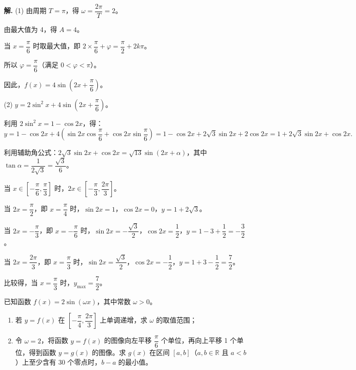\documentclass[11pt]{ctexrep}
\begin{document}
\textbf{解.} (1) 由周期 $T = \pi$，得 $\omega = \dfrac{2\pi}{T} = 2$。

由最大值为 4，得 $A = 4$。

当 $x = \dfrac{\pi}{6}$ 时取最大值，即 $2 \times \dfrac{\pi}{6} + \varphi = \dfrac{\pi}{2} + 2k\pi$。

所以 $\varphi = \dfrac{\pi}{6}$（满足 $0 < \varphi < \pi$）。

因此，$f(x) = 4\sin\left(2x + \dfrac{\pi}{6}\right)$。

(2) $y = 2\sin^2 x + 4\sin\left(2x + \dfrac{\pi}{6}\right)$。

利用 $2\sin^2 x = 1 - \cos 2x$，得：
\[
    y = 1 - \cos 2x + 4\left(\sin 2x\cos\frac{\pi}{6} + \cos 2x\sin\frac{\pi}{6}\right) = 1 - \cos 2x + 2\sqrt{3}\sin 2x + 2\cos 2x = 1 + 2\sqrt{3}\sin 2x + \cos 2x.
\]

利用辅助角公式：$2\sqrt{3}\sin 2x + \cos 2x = \sqrt{13}\sin(2x + \alpha)$，其中 $\tan\alpha = \dfrac{1}{2\sqrt{3}} = \dfrac{\sqrt{3}}{6}$。

当 $x \in \left[-\dfrac{\pi}{6}, \dfrac{\pi}{3}\right]$ 时，$2x \in \left[-\dfrac{\pi}{3}, \dfrac{2\pi}{3}\right]$。

当 $2x = \dfrac{\pi}{2}$，即 $x = \dfrac{\pi}{4}$ 时，$\sin 2x = 1$，$\cos 2x = 0$，$y = 1 + 2\sqrt{3}$。

当 $2x = -\dfrac{\pi}{3}$，即 $x = -\dfrac{\pi}{6}$ 时，$\sin 2x = -\dfrac{\sqrt{3}}{2}$，$\cos 2x = \dfrac{1}{2}$，$y = 1 - 3 + \dfrac{1}{2} = -\dfrac{3}{2}$。

当 $2x = \dfrac{2\pi}{3}$，即 $x = \dfrac{\pi}{3}$ 时，$\sin 2x = \dfrac{\sqrt{3}}{2}$，$\cos 2x = -\dfrac{1}{2}$，$y = 1 + 3 - \dfrac{1}{2} = \dfrac{7}{2}$。

比较得，当 $x = \dfrac{\pi}{3}$ 时，$y_{\max} = \dfrac{7}{2}$。

\begin{realexam}[2025 上海秋考]
    已知函数 $f(x) = 2\sin(\omega x)$，其中常数 $\omega > 0$。
    \begin{enumerate}
        \item 若 $y = f(x)$ 在 $\left[-\dfrac{\pi}{4}, \dfrac{2\pi}{3}\right]$ 上单调递增，求 $\omega$ 的取值范围；
        \item 令 $\omega = 2$，将函数 $y = f(x)$ 的图像向左平移 $\dfrac{\pi}{6}$ 个单位，再向上平移 1 个单位，得到函数 $y = g(x)$ 的图像。求 $g(x)$ 在区间 $[a, b]$（$a, b \in \mathbb{R}$ 且 $a < b$）上至少含有 30 个零点时，$b - a$ 的最小值。
    \end{enumerate}
\end{realexam}
\end{document}
